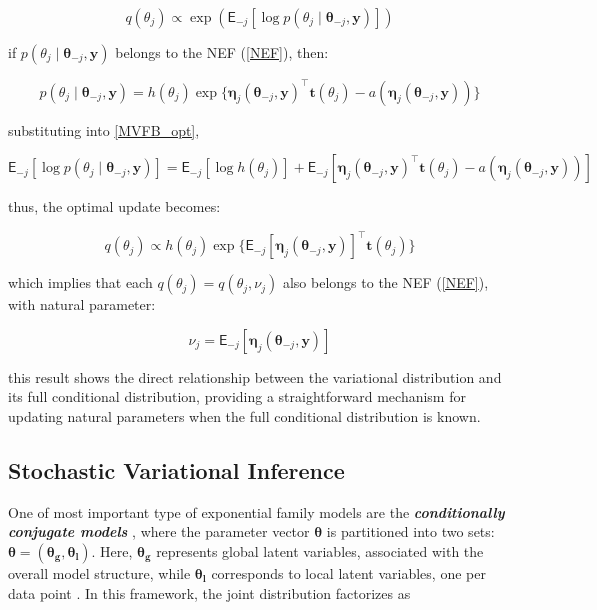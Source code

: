 \begin{equation}
\label{MVFB_opt_post}
q\left(\theta_j\right)\propto \exp{\left(\mathsf{E}_{{- j}}\left[\log{p(\theta_j\mid \bm{\theta}_{-j},\bm{y})}\right]\right)}
\end{equation}

if $p(\theta_j\mid \bm{\theta}_{-j},\bm{y})$ belongs to the \textsf{NEF} (\ref{NEF}), then:

\begin{equation}
\label{fullconditionalfed}
    p(\theta_j\mid \bm{\theta}_{-j},\bm{y}) = h(\theta_j)\exp{\lbrace\bm{\eta}_j( \bm{\theta}_{-j},\bm{y})^\top\bm{t}(\theta_{j})-a\left(\bm{\eta}_j( \bm{\theta}_{-j},\bm{y})\right)\rbrace}
\end{equation}

substituting into \ref{MVFB_opt},

\begin{equation}
   \mathsf{E}_{{-j}}\left[ \log p(\theta_j\mid \bm{\theta}_{-j},\bm{y})\right] =\mathsf{E}_{{-j}}\left[ \log h(\theta_j)\right]+\mathsf{E}_{{-j}}\left[\bm{\eta}_j( \bm{\theta}_{-j},\bm{y})^\top\bm{t}(\theta_{j})-a\left(\bm{\eta}_j( \bm{\theta}_{-j},\bm{y})\right)\right]
\end{equation}

thus, the optimal update becomes:

\begin{equation}
   q\left(\theta_j\right) \propto h(\theta_j)\exp{\lbrace\mathsf{E}_{{-j}}\left[\bm{\eta}_j( \bm{\theta}_{-j},\bm{y})\right]^\top\bm{t}(\theta_{j})\rbrace}
\end{equation}

which implies that each $q(\theta_j)=q(\theta_j,\nu_j)$ also belongs to the \textsf{NEF} (\ref{NEF}), with natural parameter: 

\begin{equation}
\label{NMVFB_opt}
\nu_{j}=\mathsf{E}_{{-j}}\left[\bm{\eta}_j( \bm{\theta}_{-j},\bm{y})\right]
\end{equation}

this result shows the direct relationship between the variational distribution and its full conditional distribution, providing a straightforward mechanism for updating natural parameters when the full conditional distribution is known.

\subsection{Stochastic Variational Inference}
\label{SVI}
One of most important type of exponential family models are the \textbf{\textit{conditionally conjugate models}} \cite{Blei2016VariationalIA}, where the parameter vector $\bm{\theta}$ is partitioned into two sets: $\bm{\theta}=(\bm{\theta_g},\bm{\theta_l})$. Here, $\bm{\theta_g}$ represents global latent variables, associated with the overall model structure, while $\bm{\theta_l}$ corresponds to local latent variables, one per data point \cite{REGUEIRO}. In this framework, the joint distribution factorizes as

